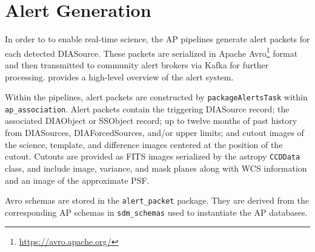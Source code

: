 \section{Alert Generation}
\label{sec:alerts}

In order to to enable real-time science, the AP pipelines generate alert packets for each detected DIASource.
These packets are serialized in Apache Avro\footnote{\url{https://avro.apache.org/}} format and then transmitted to community alert brokers via Kafka for further processing.
\citet{DMTN-093} provides a high-level overview of the alert system.

Within the pipelines, alert packets are constructed by \texttt{packageAlertsTask} within \texttt{ap\_association}.
Alert packets contain the triggering DIASource record; the associated DIAObject or SSObject record; up to twelve months of past history from DIASources, DIAForcedSources, and/or upper limits; and cutout images of the science, template, and difference images centered at the position of the cutout.
Cutouts are provided as FITS images serialized by the astropy \texttt{CCDData} class, and include image, variance, and mask planes along with WCS information and an image of the approximate PSF.

Avro schemas are stored in the \texttt{alert\_packet} package.
They are derived from the corresponding AP schemas in \texttt{sdm\_schemas} used to instantiate the AP databases.
